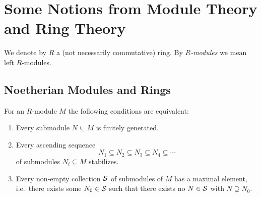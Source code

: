 \section{Some Notions from Module Theory and Ring Theory}

\begin{conventions}
  We denote by $R$ a (not necessarily commutative) ring.
  By \emph{$R$-modules} we mean left $R$-modules.
\end{conventions}










\subsection{Noetherian Modules and Rings}


\begin{lemma}
  For an $R$-module $M$ the following conditions are equivalent:
  \begin{enumerate}
    \item
      Every submodule $N \subseteq M$ is finitely generated.
    \item
      Every ascending sequence
      \[
                  N_1
        \subseteq N_2
        \subseteq N_3
        \subseteq N_4
        \subseteq \dotsb
      \]
      of submodules $N_i \subseteq M$ stabilizes.
    \item
      Every non-empty collection $\mathcal{S}$ of submodules of $M$ has a maximal element, i.e.\ there exists some $N_0 \in \mathcal{S}$ such that there exists no $N \in \mathcal{S}$ with $N \supsetneq N_0$.
  \end{enumerate}
\end{lemma}


